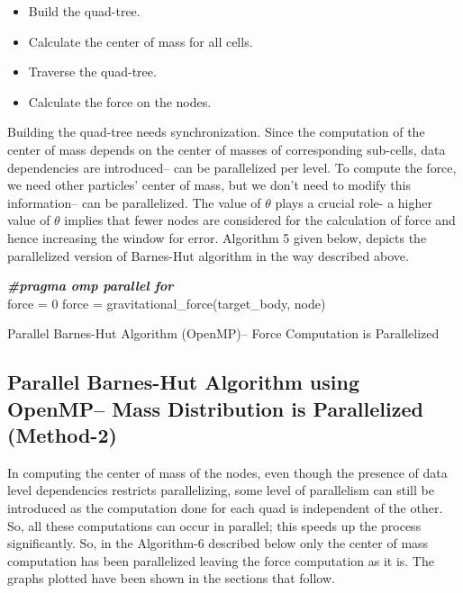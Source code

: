 \begin{itemize}
\item Build the quad-tree.
\item Calculate the center of mass for all cells.
\item Traverse the quad-tree.
\item Calculate the force on the nodes.
\end{itemize}

Building the quad-tree needs synchronization. Since the computation of the center of mass depends on the center of masses of corresponding sub-cells, data dependencies are introduced{--} can be parallelized per level. To compute the force, we need other particles' center of mass, but we don't need to modify this information{--} can be parallelized. The value of $\theta$ plays a crucial role- a higher value of $\theta$ implies that fewer nodes are considered for the calculation of force and hence increasing the window for error. Algorithm 5 given below, depicts the parallelized version of Barnes-Hut algorithm in the way described above.

\begin{algorithm}
\DontPrintSemicolon
{}
 {
  \textbf{\textit{\#pragma omp parallel for}} \\
}
\BlankLine
{}
 {
  force = 0 \;
   {
    force = gravitational\_force(target\_body, node) \;
  }
}
\label{algo:5}
\caption{Parallel Barnes-Hut Algorithm (OpenMP){--} Force Computation is Parallelized}
\end{algorithm}

\subsection{Parallel Barnes-Hut Algorithm using OpenMP{--} Mass Distribution is Parallelized (Method-2)}

In computing the center of mass of the nodes, even though the presence of data level dependencies restricts parallelizing, some level of parallelism can still be introduced as the computation done for each quad is independent of the other. So, all these computations can occur in parallel; this speeds up the process significantly. So, in the Algorithm-6 described below only the center of mass computation has been parallelized leaving the force computation as it is. The graphs plotted have been shown in the sections that follow. \par

